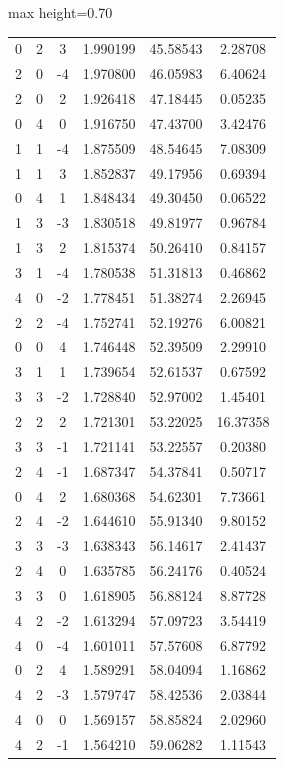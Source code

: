 \documentclass[twoside,a4paper,11pt,addpoints,answers]{exam}%
\begin{document}
\begin{center}
\begin{adjustbox}{max height=0.70\textwidth}
\begin{tabular}{cccccc}
 0 & 2 &  3 &  1.990199 &  45.58543 &   2.28708 \\
 2 & 0 & -4 &  1.970800 &  46.05983 &   6.40624 \\
 2 & 0 &  2 &  1.926418 &  47.18445 &   0.05235 \\
 0 & 4 &  0 &  1.916750 &  47.43700 &   3.42476 \\
 1 & 1 & -4 &  1.875509 &  48.54645 &   7.08309 \\
 1 & 1 &  3 &  1.852837 &  49.17956 &   0.69394 \\
 0 & 4 &  1 &  1.848434 &  49.30450 &   0.06522 \\
 1 & 3 & -3 &  1.830518 &  49.81977 &   0.96784 \\
 1 & 3 &  2 &  1.815374 &  50.26410 &   0.84157 \\
 3 & 1 & -4 &  1.780538 &  51.31813 &   0.46862 \\
 4 & 0 & -2 &  1.778451 &  51.38274 &   2.26945 \\
 2 & 2 & -4 &  1.752741 &  52.19276 &   6.00821 \\
 0 & 0 &  4 &  1.746448 &  52.39509 &   2.29910 \\
 3 & 1 &  1 &  1.739654 &  52.61537 &   0.67592 \\
 3 & 3 & -2 &  1.728840 &  52.97002 &   1.45401 \\
 2 & 2 &  2 &  1.721301 &  53.22025 &  16.37358 \\
 3 & 3 & -1 &  1.721141 &  53.22557 &   0.20380 \\
 2 & 4 & -1 &  1.687347 &  54.37841 &   0.50717 \\
 0 & 4 &  2 &  1.680368 &  54.62301 &   7.73661 \\
 2 & 4 & -2 &  1.644610 &  55.91340 &   9.80152 \\
 3 & 3 & -3 &  1.638343 &  56.14617 &   2.41437 \\
 2 & 4 &  0 &  1.635785 &  56.24176 &   0.40524 \\
 3 & 3 &  0 &  1.618905 &  56.88124 &   8.87728 \\
 4 & 2 & -2 &  1.613294 &  57.09723 &   3.54419 \\
 4 & 0 & -4 &  1.601011 &  57.57608 &   6.87792 \\
 0 & 2 &  4 &  1.589291 &  58.04094 &   1.16862 \\
 4 & 2 & -3 &  1.579747 &  58.42536 &   2.03844 \\
 4 & 0 &  0 &  1.569157 &  58.85824 &   2.02960 \\
 4 & 2 & -1 &  1.564210 &  59.06282 &   1.11543 \\

\end{tabular}
\end{adjustbox}
\end{center}
\end{document}
